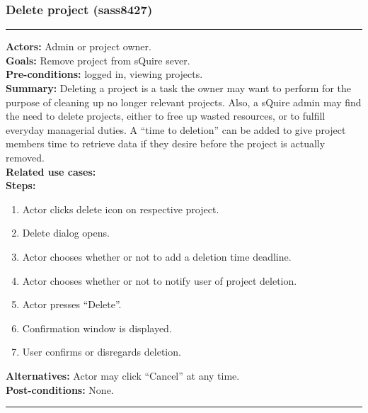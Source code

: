 \documentclass[11pt]{report}
\begin{document}
\subsubsection{Delete project (sass8427)}
\vspace{2pt}
\hrule
\vspace{8pt}
 \textbf{Actors:} Admin or project owner. \\ 
 \textbf{Goals:} Remove project from sQuire sever. \\
 \textbf{Pre-conditions:} logged in, viewing projects.  \\
\textbf{Summary:} Deleting a project is a task the owner may want to perform for the purpose of cleaning up no longer relevant projects. Also, a sQuire admin may find the need to delete projects, either to free up wasted resources, or to fulfill everyday managerial duties. A “time to deletion” can be added to give project members time to retrieve data if they desire before the project is actually removed. \\ 
 \textbf{Related use cases:} \\ 
 \textbf{Steps:} \begin{enumerate}
  \item Actor clicks delete icon on respective project.
  \item Delete dialog opens.
  \item Actor chooses whether or not to add a deletion time deadline. 
  \item Actor chooses whether or not to notify user of project deletion. 
  \item Actor presses “Delete”. 
  \item Confirmation window is displayed.
  \item User confirms or disregards deletion.
 \end{enumerate}
 \textbf{Alternatives:} Actor may click “Cancel” at any time. \\
 \textbf{Post-conditions:} None. \\
 \vspace{8pt}
\hrule
\newpage
\end{document}

